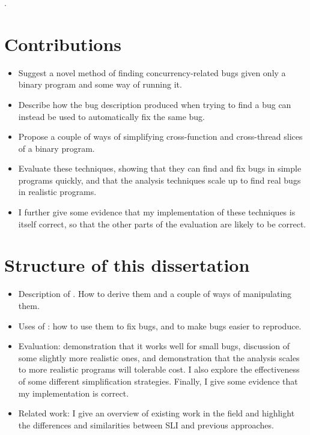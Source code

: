 .

\section{Contributions}

\begin{itemize}
\item
  Suggest a novel method of finding concurrency-related bugs given
  only a binary program and some way of running it.
\item
  Describe how the bug description produced when trying to find a bug
  can instead be used to automatically fix the same bug.
\item
  Propose a couple of ways of simplifying cross-function and
  cross-thread slices of a binary program.
\item
  Evaluate these techniques, showing that they can find and fix bugs
  in simple programs quickly, and that the analysis techniques
   scale up to find real bugs in realistic
  programs.
\item
  I further give some evidence that my implementation of these
  techniques is itself correct, so that the other parts of the
  evaluation are likely to be correct.
\end{itemize}


\section{Structure of this dissertation}

\begin{itemize}
\item Description of \StateMachines.  How to derive them and a couple
  of ways of manipulating them.
\item Uses of \StateMachines: how to use them to fix bugs, and to make
  bugs easier to reproduce.
\item Evaluation: demonstration that it works well for small bugs,
  discussion of some slightly more realistic ones, and demonstration
  that the analysis scales to more realistic programs will tolerable
  cost.  I also explore the effectiveness of some different
  \StateMachine simplification strategies.  Finally, I give some
  evidence that my implementation is correct.
\item Related work: I give an overview of existing work in the field
  and highlight the differences and similarities between SLI and
  previous approaches.
\end{itemize}


